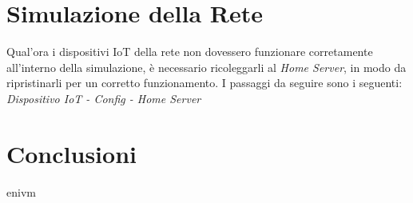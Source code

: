 \documentclass[italian, 12pt, a4paper]{article}
\begin{document}
\section{Simulazione della Rete}\label{sec:simulazione}
Qual'ora i dispositivi IoT della rete non dovessero funzionare corretamente all'interno della simulazione, è necessario ricoleggarli al \emph{Home Server}, in modo da ripristinarli per un corretto funzionamento. I passaggi da seguire sono i seguenti: \\ \emph{Dispositivo IoT - Config - Home Server} \\

\clearpage

\section{Conclusioni}\label{sec:conclusioni}
enivm
\clearpage
\end{document}
